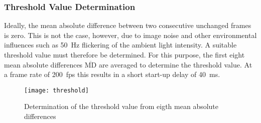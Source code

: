 \subsubsection{Threshold Value Determination}
\label{subsubsec:threshold}


Ideally, the mean absolute difference between two consecutive unchanged frames is zero.
This is not the case, however, due to image noise and other environmental influences such as \SI{50}{Hz} flickering of the ambient light intensity.
A suitable threshold value must therefore be determined.
For this purpose, the first eight mean absolute differences $\overline{\text{MD}}$ are averaged to determine the threshold value.
At a frame rate of \SI{200}{fps} this results in a short start-up delay of \SI{40}{ms}.

\begin{figure}[h]
  \centering
  \texttt{[image: threshold]}
  \caption{Determination of the threshold value from eigth mean absolute differences}
  \label{fig:threshold}
\end{figure}
